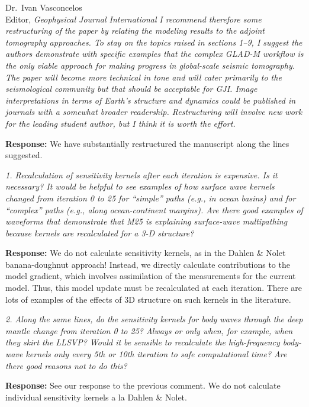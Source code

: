 \documentclass[11pt,a4paper]{letter}
\newcommand{\cyan}[1]{\textbf{\textcolor{Cyan}{#1}}}
\newcommand{\orange}[1]{\textbf{\textcolor{Orange}{#1}}}
\newcommand{\toebru}[1]{\textbf{\cyan{*** Ebru: #1 ***}}}
\newcommand{\fromebru}[1]{\textbf{\orange{*** Ebru: #1 ***}}}
\newcommand{\response}[1]{\textbf{Response:} #1}
\newcommand{\rev}[1]{{\it{#1}}}
\begin{document}
\begin{letter}{Dr.~Ivan Vasconcelos\\
Editor, \textit{Geophysical Journal International}}
\rev{I recommend therefore some restructuring of the paper by relating the modeling results to the adjoint tomography approaches. To stay on the topics raised in sections 1--9, I suggest the authors demonstrate with specific examples that the complex GLAD-M workflow is the only viable approach for making progress in global-scale seismic tomography. The paper will become more technical in tone and will cater primarily to the seismological community but that should be acceptable for GJI. Image interpretations in terms of Earth's structure and dynamics could be published in journals with a somewhat broader readership. Restructuring will involve new work for the leading student author, but I think it is worth the effort.
}

\response{We have substantially restructured the manuscript along the lines suggested.}

\rev{1. Recalculation of sensitivity kernels after each iteration is expensive. Is it necessary?
It would be helpful to see examples of how surface wave kernels changed from iteration 0 to 25 for ``simple'' paths (e.g., in ocean basins) and for ``complex'' paths (e.g., along ocean-continent margins). Are there good examples of waveforms that demonstrate that M25 is explaining surface-wave multipathing because kernels are recalculated for a 3-D structure?
}

\response{We do not calculate sensitivity kernels, as in the Dahlen \& Nolet banana-doughnut approach! Instead, we directly calculate contributions to the model gradient, which involves assimilation of the measurements for the current model. Thus, this model update must be recalculated at each iteration.
There are lots of examples of the effects of 3D structure on such kernels in the literature.}

\rev{2. Along the same lines, do the sensitivity kernels for body waves through the deep mantle change from iteration 0 to 25? Always or only when, for example, when they skirt the LLSVP? Would it be sensible to recalculate the high-frequency body-wave kernels only every 5th or 10th iteration to safe computational time? Are there good reasons not to do this?
}

\response{See our response to the previous comment. We do not calculate individual sensitivity kernels a la Dahlen \& Nolet.
}


\end{letter}
\end{document}
